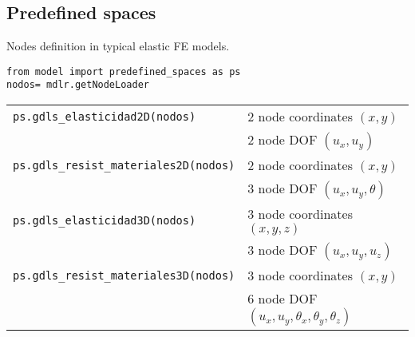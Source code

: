 \subsection{Predefined spaces}
Nodes definition in typical elastic FE models.
\begin{verbatim}
from model import predefined_spaces as ps
nodos= mdlr.getNodeLoader
\end{verbatim}
\begin{center} 
\begin{longtable}{ll}
{\tt ps.gdls\_elasticidad2D(nodos)} & 2 node coordinates $(x,y)$ \\
                                    & 2 node DOF $(u_x,u_y)$ \\ 
{\tt ps.gdls\_resist\_materiales2D(nodos)} & 2 node coordinates $(x,y)$ \\
                                    & 3 node DOF $(u_x,u_y,\theta)$ \\ 
{\tt ps.gdls\_elasticidad3D(nodos)} & 3 node coordinates $(x,y,z)$ \\
                                    & 3 node DOF $(u_x,u_y,u_z)$ \\ 
{\tt ps.gdls\_resist\_materiales3D(nodos)} & 3 node coordinates $(x,y)$ \\
                                    & 6 node DOF $(u_x,u_y,\theta_x,\theta_y,\theta_z)$ \\ 
\end{longtable} \end{center}

